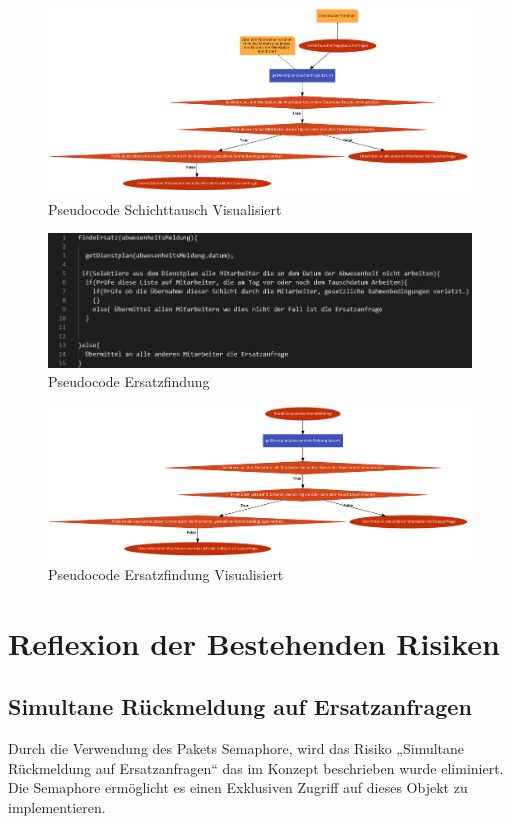 \documentclass[11pt,
paper=a4,
bibtotocnumbered,	  %
liststotocnumbered,  %
DIV=calc,		  %
tablecaptionabove,	  %
headinclude,
]{article}
\begin{document}
\begin{figure}[H]
\includegraphics[width=1\textwidth]{Bilder/TauschanfragenPseudo.png}
\caption{Pseudocode Schichttausch Visualisiert}
\end{figure}
\begin{figure}[H]
\includegraphics[width=1\textwidth]{Bilder/pseudoE.jpg}
\caption{Pseudocode Ersatzfindung}
\end{figure}
\begin{figure}[H]
\includegraphics[width=1\textwidth]{Bilder/ersatzPseudo.png}
\caption{Pseudocode Ersatzfindung Visualisiert}
\end{figure}
\section{Reflexion der Bestehenden Risiken}
\subsection{Simultane Rückmeldung auf Ersatzanfragen}
Durch die Verwendung des Pakets Semaphore, wird das Risiko „Simultane Rückmeldung auf Ersatzanfragen“ das im Konzept beschrieben wurde eliminiert. Die Semaphore ermöglicht es einen Exklusiven Zugriff auf dieses Objekt zu implementieren. 
\end{document}
